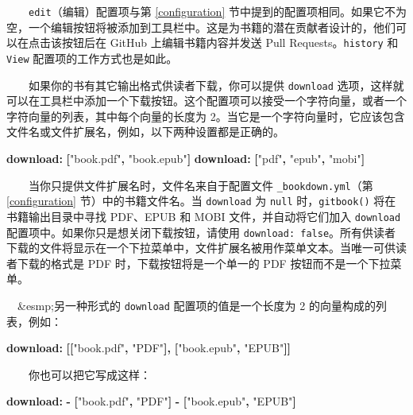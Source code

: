 \documentclass[
  12pt,
]{krantz}
\newenvironment{Shaded}{\begin{snugshade}}{\end{snugshade}}
\newcommand{\AttributeTok}[1]{\textcolor[rgb]{0.13,0.29,0.53}{#1}}
\newcommand{\FunctionTok}[1]{\textcolor[rgb]{0.13,0.29,0.53}{\textbf{#1}}}
\newcommand{\KeywordTok}[1]{\textcolor[rgb]{0.13,0.29,0.53}{\textbf{#1}}}
\newcommand{\StringTok}[1]{\textcolor[rgb]{0.31,0.60,0.02}{#1}}
\theoremstyle{definition}
\theoremstyle{definition}
\theoremstyle{definition}
\theoremstyle{definition}
\theoremstyle{remark}
\begin{document}
  \texttt{edit}（编辑）配置项与第 \ref{configuration} 节中提到的配置项相同。如果它不为空，一个编辑按钮将被添加到工具栏中。这是为书籍的潜在贡献者设计的，他们可以在点击该按钮后在 GitHub 上编辑书籍内容并发送 Pull Requests。\texttt{history} 和 \texttt{View} 配置项的工作方式也是如此。

  如果你的书有其它输出格式供读者下载，你可以提供 \texttt{download} 选项，这样就可以在工具栏中添加一个下载按钮。这个配置项可以接受一个字符向量，或者一个字符向量的列表，其中每个向量的长度为 2。当它是一个字符向量时，它应该包含文件名或文件扩展名，例如，以下两种设置都是正确的。

\begin{Shaded}
\begin{Highlighting}[]
\AttributeTok{    }\FunctionTok{download}\KeywordTok{:}\AttributeTok{ }\KeywordTok{[}\StringTok{"book.pdf"}\KeywordTok{,}\AttributeTok{ }\StringTok{"book.epub"}\KeywordTok{]}
\AttributeTok{    }\FunctionTok{download}\KeywordTok{:}\AttributeTok{ }\KeywordTok{[}\StringTok{"pdf"}\KeywordTok{,}\AttributeTok{ }\StringTok{"epub"}\KeywordTok{,}\AttributeTok{ }\StringTok{"mobi"}\KeywordTok{]}
\end{Highlighting}
\end{Shaded}

  当你只提供文件扩展名时，文件名来自于配置文件 \texttt{\_bookdown.yml}（第 \ref{configuration} 节）中的书籍文件名。当 \texttt{download} 为 \texttt{null} 时，\texttt{gitbook()} 将在书籍输出目录中寻找 PDF、EPUB 和 MOBI 文件，并自动将它们加入 \texttt{download} 配置项中。如果你只是想关闭下载按钮，请使用 \texttt{download:\ false}。所有供读者下载的文件将显示在一个下拉菜单中，文件扩展名被用作菜单文本。当唯一可供读者下载的格式是 PDF 时，下载按钮将是一个单一的 PDF 按钮而不是一个下拉菜单。

 \&esmp;另一种形式的 \texttt{download} 配置项的值是一个长度为 2 的向量构成的列表，例如：

\begin{Shaded}
\begin{Highlighting}[]
\AttributeTok{    }\FunctionTok{download}\KeywordTok{:}\AttributeTok{ }\KeywordTok{[[}\StringTok{"book.pdf"}\KeywordTok{,}\AttributeTok{ }\StringTok{"PDF"}\KeywordTok{],}\AttributeTok{ }\KeywordTok{[}\StringTok{"book.epub"}\KeywordTok{,}\AttributeTok{ }\StringTok{"EPUB"}\KeywordTok{]]}
\end{Highlighting}
\end{Shaded}

  你也可以把它写成这样：

\begin{Shaded}
\begin{Highlighting}[]
\AttributeTok{    }\FunctionTok{download}\KeywordTok{:}
\AttributeTok{      }\KeywordTok{{-}}\AttributeTok{ }\KeywordTok{[}\StringTok{"book.pdf"}\KeywordTok{,}\AttributeTok{ }\StringTok{"PDF"}\KeywordTok{]}
\AttributeTok{      }\KeywordTok{{-}}\AttributeTok{ }\KeywordTok{[}\StringTok{"book.epub"}\KeywordTok{,}\AttributeTok{ }\StringTok{"EPUB"}\KeywordTok{]}
\end{Highlighting}
\end{Shaded}
\end{document}

